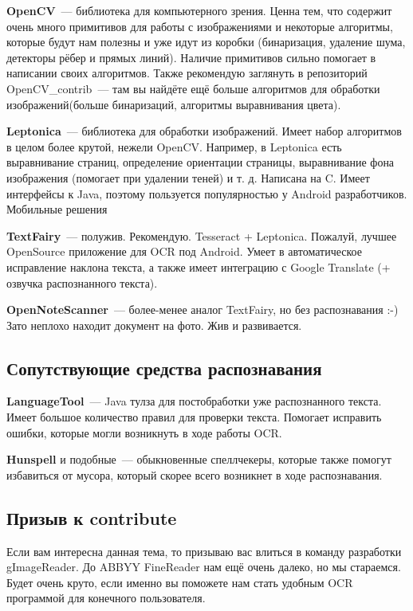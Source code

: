 \documentclass[10pt, a5paper]{article}
\begin{document}
\textbf{OpenCV}~--- библиотека для компьютерного зрения. Ценна тем, что содержит очень много примитивов для работы с изображениями и некоторые алгоритмы, которые будут нам полезны и уже идут из коробки (бинаризация, удаление шума, детекторы рёбер и прямых линий). Наличие примитивов сильно помогает в написании своих алгоритмов. Также рекомендую заглянуть в репозиторий OpenCV\_contrib~--- там вы найдёте ещё больше алгоритмов для обработки изображений(больше бинаризаций, алгоритмы выравнивания цвета).

\textbf{Leptonica}~--- библиотека для обработки изображений. Имеет набор алгоритмов в целом более крутой, нежели OpenCV. Например, в Leptonica есть выравнивание страниц, определение ориентации страницы, выравнивание фона изображения (помогает при удалении теней) и т. д. Написана на C. Имеет интерфейсы к Java, поэтому пользуется популярностью у Android разработчиков.
Мобильные решения

\textbf{TextFairy}~--- полужив. Рекомендую. Tesseract + Leptonica. Пожалуй, лучшее OpenSource приложение для OCR под Android. Умеет в автоматическое исправление наклона текста, а также имеет интеграцию с Google Translate (+ озвучка распознанного текста).

\textbf{OpenNoteScanner}~--- более-менее аналог TextFairy, но без распознавания :-) Зато неплохо находит документ на фото. Жив и развивается.

\subsection*{Сопутствующие средства распознавания}

\textbf{LanguageTool}~--- Java тулза для постобработки уже распознанного текста. Имеет большое количество правил для проверки текста. Помогает исправить ошибки, которые могли возникнуть в ходе работы OCR.

\textbf{Hunspell} и подобные~--- обыкновенные спеллчекеры, которые также помогут избавиться от мусора, который скорее всего возникнет в ходе распознавания.

\subsection*{Призыв к contribute}

Если вам интересна данная тема, то призываю вас влиться в команду разработки gImageReader. До ABBYY FineReader нам ещё очень далеко, но мы стараемся. Будет очень круто, если именно вы поможете нам стать удобным OCR программой для конечного пользователя.
\end{document}
